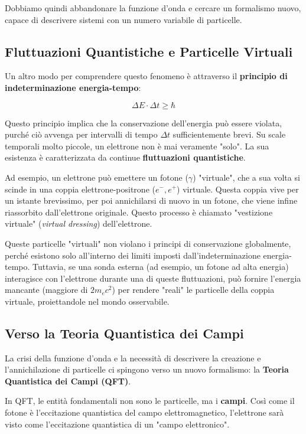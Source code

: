 Dobbiamo quindi abbandonare la funzione d'onda e cercare un formalismo nuovo, capace di descrivere sistemi con un numero variabile di particelle.

\subsection{Fluttuazioni Quantistiche e Particelle Virtuali}

Un altro modo per comprendere questo fenomeno è attraverso il \textbf{principio di indeterminazione energia-tempo}:

$$
\Delta E \cdot \Delta t \ge \hbar
$$

Questo principio implica che la conservazione dell'energia può essere violata, purché ciò avvenga per intervalli di tempo $\Delta t$ sufficientemente brevi. Su scale temporali molto piccole, un elettrone non è mai veramente "solo". La sua esistenza è caratterizzata da continue \textbf{fluttuazioni quantistiche}.


Ad esempio, un elettrone può emettere un fotone ($\gamma$) "virtuale", che a sua volta si scinde in una coppia elettrone-positrone ($e^-, e^+$) virtuale. Questa coppia vive per un istante brevissimo, per poi annichilarsi di nuovo in un fotone, che viene infine riassorbito dall'elettrone originale. Questo processo è chiamato "vestizione virtuale" (\textit{virtual dressing}) dell'elettrone.

Queste particelle "virtuali" non violano i principi di conservazione globalmente, perché esistono solo all'interno dei limiti imposti dall'indeterminazione energia-tempo. Tuttavia, se una sonda esterna (ad esempio, un fotone ad alta energia) interagisce con l'elettrone durante una di queste fluttuazioni, può fornire l'energia mancante (maggiore di $2m_ec^2$) per rendere "reali" le particelle della coppia virtuale, proiettandole nel mondo osservabile.

\subsection{Verso la Teoria Quantistica dei Campi}

La crisi della funzione d'onda e la necessità di descrivere la creazione e l'annichilazione di particelle ci spingono verso un nuovo formalismo: la \textbf{Teoria Quantistica dei Campi (QFT)}.

In QFT, le entità fondamentali non sono le particelle, ma i \textbf{campi}. Così come il fotone è l'eccitazione quantistica del campo elettromagnetico, l'elettrone sarà visto come l'eccitazione quantistica di un "campo elettronico".

